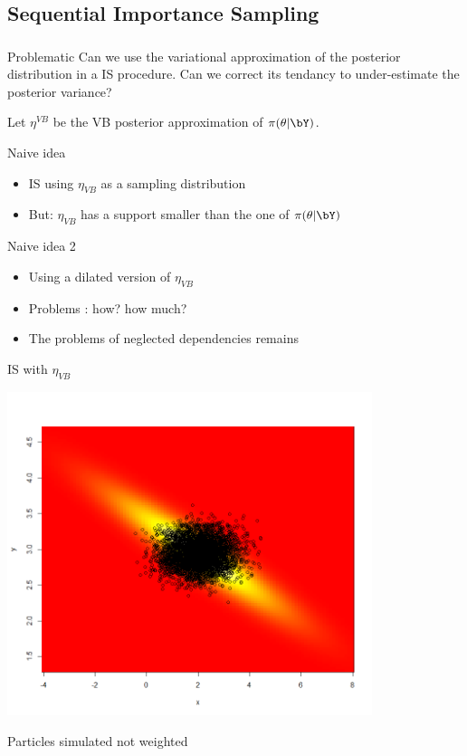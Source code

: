 \subsection[VB-IS]{Sequential Importance Sampling}
\begin{frame}\frametitle{}


\begin{block}{Problematic}
Can we use the variational approximation of the posterior distribution in a IS procedure. Can we correct its tendancy to under-estimate the posterior variance?  
\end{block}

Let  $\eta^{VB}$ be the VB posterior approximation of  $\pi(\theta|\bY)$. 

\begin{block}{Naive idea}
\begin{itemize}
\item IS using  $\eta_{VB}$ as a sampling distribution
\item  \vert But\noir : $\eta_{VB}$ has a support smaller than the one of  $\pi(\theta|\bY)$ 
\end{itemize}
\end{block}
\begin{block}{Naive idea 2}
\begin{itemize}
\item Using a dilated version of  $\eta_{VB}$
\item  Problems : how? how much? 
\item The problems of neglected dependencies remains
\end{itemize}
\end{block}

\end{frame}
\begin{frame}{IS with $\eta_{VB}$ }

\centering 
 \includegraphics[width=0.8\textwidth]{figures/IS_sampling_VBEM.png}
 
 Particles simulated not weighted 
  \end{frame}

